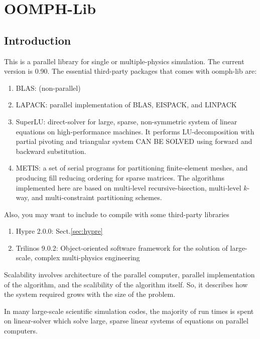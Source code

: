 \chapter{OOMPH-Lib}
\label{chap:OOMPH-Lib}

\section{Introduction}

This is a parallel library for single or multiple-physics simulation. 
The current version is 0.90. The essential third-party packages that comes with
oomph-lib are:
\begin{enumerate}
  \item BLAS: (non-parallel)
  \item LAPACK: parallel implementation of BLAS, EISPACK, and LINPACK
  \item SuperLU: direct-solver for large, sparse, non-symmetric system of linear
  equations on high-performance machines. It performs LU-decomposition with
  partial pivoting and triangular system CAN BE SOLVED using forward and
  backward substitution.
  \item METIS: a set of serial programs for partitioning finite-element meshes,
  and producing fill reducing ordering for sparse matrices. The algorithms
  implemented here are based on multi-level recursive-bisection, multi-level
  $k$-way, and multi-constraint partitioning schemes.
\end{enumerate}

Also, you may want to include to compile with some third-party libraries
\begin{enumerate}
  \item Hypre 2.0.0: Sect.\ref{sec:hypre}

  \item Trilinos 9.0.2: Object-oriented software framework for the solution of
  large-scale, complex multi-physics engineering
  
\end{enumerate}

Scalability involves architecture of the parallel computer, parallel
implementation of the algorithm, and the scalibility of the algorithm itself.
So, it describes how the system required grows with the size of the problem.

In many large-scale scientific simulation codes, the majority of run times is
spent on linear-solver which solve large, sparse linear systems of equations on
parallel computers.

